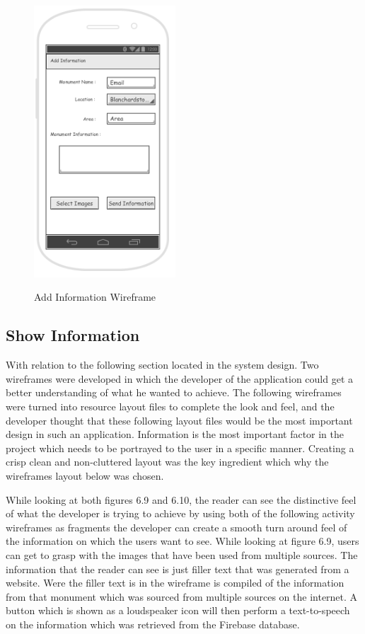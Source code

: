 \begin{figure}[htbp]
    \center \includegraphics[width=150pt]{addInformationWireframe}\\
    \caption{Add Information Wireframe} \label{Figure: Add Information Wireframe}
\end{figure}


\subsection{Show Information}
With relation to the following section located in the system design. Two wireframes were developed in which the developer of the application could get a better understanding of what he wanted to achieve. The following wireframes were turned into resource layout files to complete the look and feel, and the developer thought that these following layout files would be the most important design in such an application. Information is the most important factor in the project which needs to be portrayed to the user in a specific manner. Creating a crisp clean and non-cluttered layout was the key ingredient which why the wireframes layout below was chosen.
\par
While looking at both figures 6.9 and 6.10, the reader can see the distinctive feel of what the developer is trying to achieve by using both of the following activity wireframes as fragments the developer can create a smooth turn around feel of the information on which the users want to see. While looking at figure 6.9, users can get to grasp with the images that have been used from multiple sources. The information that the reader can see is just filler text that was generated from a website. Were the filler text is in the wireframe is compiled of the information from that monument which was sourced from multiple sources on the internet. A button which is shown as a loudspeaker icon will then perform a text-to-speech on the information which was retrieved from the Firebase database.

